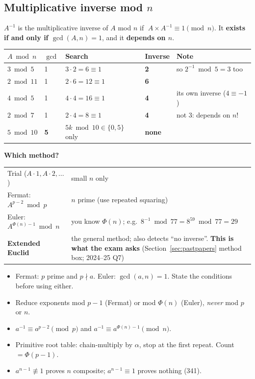 \subsection{Multiplicative inverse mod $n$}
\begin{keybox}
$A^{-1}$ is the multiplicative inverse of $A$ mod $n$ if $\;A \times A^{-1} \equiv 1 \pmod n$.
It \textbf{exists if and only if $\gcd(A, n) = 1$}, and it \textbf{depends on $n$}.
\end{keybox}
\begin{center}\small
\begin{tabular}{@{}lllll@{}}
\toprule
$A \bmod n$ & $\gcd$ & Search & Inverse & Note\\
\midrule
$3 \bmod 5$ & 1 & $3\cdot2 = 6 \equiv 1$ & \textbf{2} & so $2^{-1} \bmod 5 = 3$ too\\
$2 \bmod 11$ & 1 & $2\cdot6 = 12 \equiv 1$ & \textbf{6} & \\
$4 \bmod 5$ & 1 & $4\cdot4 = 16 \equiv 1$ & \textbf{4} & its own inverse ($4 \equiv -1$)\\
$2 \bmod 7$ & 1 & $2\cdot4 = 8 \equiv 1$ & \textbf{4} & not 3: depends on $n$!\\
$5 \bmod 10$ & \textbf{5} & $5k \bmod 10 \in \{0, 5\}$ only & \textbf{none} & \\
\bottomrule
\end{tabular}
\end{center}
\textbf{Which method?}
\begin{center}\small
\begin{tabularx}{\textwidth}{@{}l X@{}}
\toprule
Trial ($A\cdot1, A\cdot2, \dots$) & small $n$ only\\
Fermat: $A^{p-2} \bmod p$ & $n$ prime (use repeated squaring)\\
Euler: $A^{\Phi(n)-1} \bmod n$ & you know $\Phi(n)$; e.g.\ $8^{-1} \bmod 77 = 8^{59} \bmod 77 = 29$\\
\textbf{Extended Euclid} & the general method; also detects ``no inverse''. \textbf{This is what the exam asks} (Section~\ref{sec:pastpapers} method box; 2024--25 Q7)\\
\bottomrule
\end{tabularx}
\end{center}

\begin{examtip}
\begin{itemize}
  \item Fermat: $p$ prime and $p \nmid a$. Euler: $\gcd(a, n) = 1$. State the conditions before using either.
  \item Reduce exponents mod $p - 1$ (Fermat) or mod $\Phi(n)$ (Euler), \emph{never} mod $p$ or $n$.
  \item $a^{-1} \equiv a^{p-2} \pmod p$ and $a^{-1} \equiv a^{\Phi(n)-1} \pmod n$.
  \item Primitive root table: chain-multiply by $\alpha$, stop at the first repeat. Count $= \Phi(p-1)$.
  \item $a^{n-1} \not\equiv 1$ proves $n$ composite; $a^{n-1} \equiv 1$ proves nothing (341).
\end{itemize}
\end{examtip}

